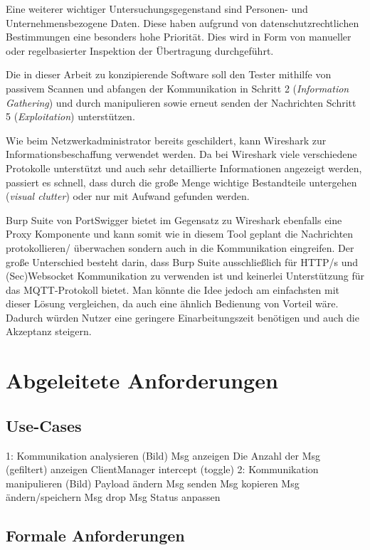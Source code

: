     Eine weiterer wichtiger Untersuchungsgegenstand sind Personen- und Unternehmensbezogene Daten. Diese haben aufgrund von datenschutzrechtlichen Bestimmungen eine besonders hohe Priorität. Dies wird in Form von manueller oder regelbasierter Inspektion der Übertragung durchgeführt.
    
    
    Die in dieser Arbeit zu konzipierende Software soll den Tester mithilfe von passivem Scannen und abfangen der Kommunikation in Schritt 2 (\emph{Information Gathering}) und durch manipulieren sowie erneut senden der Nachrichten Schritt 5 (\emph{Exploitation}) unterstützen.
    
    Wie beim Netzwerkadministrator bereits geschildert, kann Wireshark zur Informationsbeschaffung verwendet werden.
    Da bei Wireshark viele verschiedene Protokolle unterstützt und auch sehr detaillierte Informationen angezeigt werden, passiert es schnell, dass durch die große Menge wichtige Bestandteile untergehen (\emph{visual clutter}) oder nur mit Aufwand gefunden werden.
    
    Burp Suite von PortSwigger bietet im Gegensatz zu Wireshark ebenfalls eine Proxy Komponente und kann somit wie in diesem Tool geplant die Nachrichten protokollieren/ überwachen sondern auch in die Kommunikation eingreifen. Der große Unterschied besteht darin, dass Burp Suite ausschließlich für HTTP/s und (Sec)Websocket Kommunikation zu verwenden ist und keinerlei Unterstützung für das \ac{MQTT}-Protokoll bietet. Man könnte die Idee jedoch am einfachsten mit dieser Lösung vergleichen, da auch eine ähnlich Bedienung von Vorteil wäre. Dadurch würden Nutzer eine geringere Einarbeitungszeit benötigen und auch die Akzeptanz steigern.

\section{Abgeleitete Anforderungen}
    \subsection{Use-Cases}
    1: Kommunikation analysieren (Bild)
    	Msg anzeigen
    	Die Anzahl der Msg (gefiltert) anzeigen
    	ClientManager intercept (toggle)
    2: Kommunikation manipulieren (Bild)
    	Payload ändern
    	Msg senden
    	Msg kopieren
    	Msg ändern/speichern
    	Msg drop
    	Msg Status anpassen
    	
    \subsection{Formale Anforderungen}